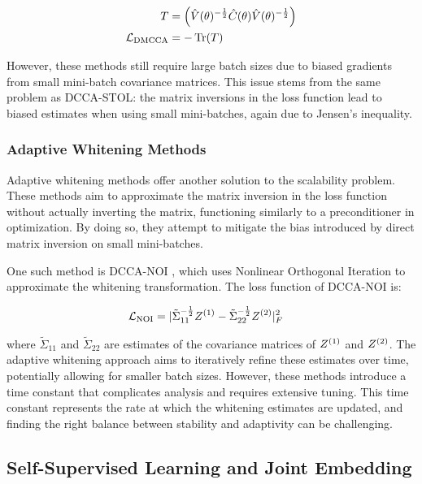 \begin{align}
    T      & = \left(\hat{V}(\theta)^{-\frac{1}{2}} \hat{C}(\theta)\hat{V}(\theta)^{-\frac{1}{2}}\right) \\
    \mathcal{L}_\text{DMCCA} & = -\operatorname{Tr}(T)
\end{align}

However, these methods still require large batch sizes due to biased gradients from small mini-batch covariance matrices. This issue stems from the same problem as DCCA-STOL: the matrix inversions in the loss function lead to biased estimates when using small mini-batches, again due to Jensen's inequality.

\subsubsection{Adaptive Whitening Methods}
Adaptive whitening methods \citep{wang2015stochastic, chang2018scalable} offer another solution to the scalability problem. These methods aim to approximate the matrix inversion in the loss function without actually inverting the matrix, functioning similarly to a preconditioner in optimization. By doing so, they attempt to mitigate the bias introduced by direct matrix inversion on small mini-batches.

One such method is DCCA-NOI \citep{wang2015unsupervised}, which uses Nonlinear Orthogonal Iteration to approximate the whitening transformation. The loss function of DCCA-NOI is:

\begin{align}
    \mathcal{L}_\text{NOI} & = |{\tilde{\Sigma}_{11}}^{-\frac{1}{2}} Z^{(1)}-{\tilde{\Sigma}_{22}}^{-\frac{1}{2}} Z^{(2)}|^2_F
\end{align}

where $\tilde{\Sigma}_{11}$ and $\tilde{\Sigma}_{22}$ are estimates of the covariance matrices of $Z^{(1)}$ and $Z^{(2)}$. The adaptive whitening approach aims to iteratively refine these estimates over time, potentially allowing for smaller batch sizes. However, these methods introduce a time constant that complicates analysis and requires extensive tuning. This time constant represents the rate at which the whitening estimates are updated, and finding the right balance between stability and adaptivity can be challenging.

\subsection{Self-Supervised Learning and Joint Embedding}

